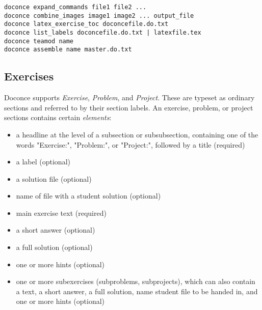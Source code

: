 \documentclass[twoside]{article}
\begin{document}
\begin{Verbatim}
doconce expand_commands file1 file2 ...
doconce combine_images image1 image2 ... output_file
doconce latex_exercise_toc doconcefile.do.txt
doconce list_labels doconcefile.do.txt | latexfile.tex
doconce teamod name
doconce assemble name master.do.txt
\end{Verbatim}

\subsection{Exercises}

Doconce supports \emph{Exercise}, \emph{Problem}, and \emph{Project}. These are typeset
as ordinary sections and referred to by their section labels.
An exercise, problem, or project sections contains certain \emph{elements}:

\begin{itemize}
  \item a headline at the level of a subsection or subsubsection,
    containing one of the words "Exercise:", "Problem:", or
    "Project:", followed by a title (required)

  \item a label (optional)

  \item a solution file (optional)

  \item name of file with a student solution (optional)

  \item main exercise text (required)

  \item a short answer (optional)

  \item a full solution (optional)

  \item one or more hints (optional)

  \item one or more subexercises (subproblems, subprojects), which can also
    contain a text, a short answer, a full solution, name student file
    to be handed in, and one or more hints (optional)
\end{itemize}
\end{document}
